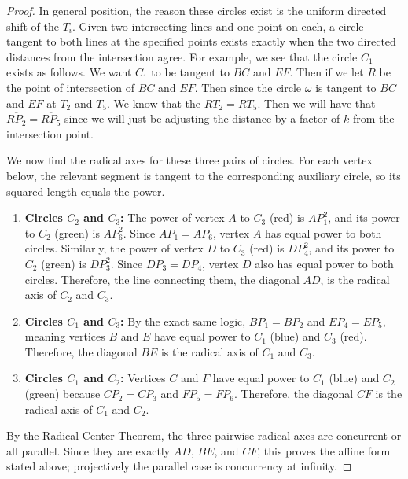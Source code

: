 \documentclass[reqno]{amsart}
\DeclareMathOperator{\1}{\textbf{1}}
\begin{document}
\begin{proof}
In general position, the reason these circles exist is the uniform directed
shift of the $T_i$. Given two intersecting lines and one point on each, a
circle tangent to both lines at the specified points exists exactly when the
two directed distances from the intersection agree.
For example, we see that the circle $C_1$ exists as follows. We want $C_1$ to be tangent to $BC$ and $EF$. Then if we let $R$ be the point of intersection of $BC$ and $EF$. Then since the circle
$\omega$ is tangent to $BC$ and $EF$ at $T_2$ and $T_5$. We know that the $\overline{RT_2}=\overline{RT_5}$. Then we will have that $\overline{RP_2}=\overline{RP_5}$ since we will just be adjusting
the distance by a factor of $k$ from the intersection point. 

We now find the radical axes for these three pairs of circles. For each vertex
below, the relevant segment is tangent to the corresponding auxiliary circle,
so its squared length equals the power.

\begin{enumerate}
    \item \textbf{Circles $C_2$ and $C_3$:} 
    The power of vertex $A$ to $C_3$ (red) is $AP_1^2$, and its power to $C_2$ (green) is $AP_6^2$. Since $AP_1 = AP_6$, vertex $A$ has equal power to both circles. Similarly, the power of vertex $D$ to $C_3$ (red) is $DP_4^2$, and its power to $C_2$ (green) is $DP_3^2$. Since $DP_3 = DP_4$, vertex $D$ also has equal power to both circles. Therefore, the line connecting them, the diagonal \textbf{$AD$}, is the radical axis of $C_2$ and $C_3$.

    \item \textbf{Circles $C_1$ and $C_3$:} 
    By the exact same logic, $BP_1 = BP_2$ and $EP_4 = EP_5$, meaning vertices $B$ and $E$ have equal power to $C_1$ (blue) and $C_3$ (red). Therefore, the diagonal \textbf{$BE$} is the radical axis of $C_1$ and $C_3$.

    \item \textbf{Circles $C_1$ and $C_2$:}
    Vertices $C$ and $F$ have equal power to $C_1$ (blue) and $C_2$ (green) because $CP_2 = CP_3$ and $FP_5 = FP_6$. Therefore, the diagonal \textbf{$CF$} is the radical axis of $C_1$ and $C_2$.
\end{enumerate}

By the Radical Center Theorem, the three pairwise radical axes are concurrent
or all parallel. Since they are exactly $AD$, $BE$, and $CF$, this proves the
affine form stated above; projectively the parallel case is concurrency at
infinity.
\end{proof}
\end{document}
